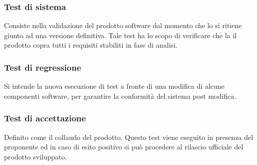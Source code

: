 \subsubsection{Test di sistema}
Consiste nella validazione del prodotto software dal momento che lo si ritiene giunto ad una versione definitiva. Tale test ha lo scopo di verificare che la il prodotto copra tutti i requisiti stabiliti in fase di analisi.
\subsubsection{Test di regressione}
Si intende la nuova esecuzione di test a fronte di una modifica di alcune componenti software, per garantire la conformità del sistema post modifica.
\subsubsection{Test di accettazione}
Definito come il collaudo del prodotto. Questo test viene eseguito in presenza del proponente ed in caso di esito positivo si può procedere al rilascio ufficiale del prodotto sviluppato.